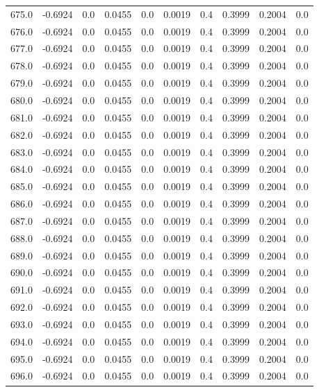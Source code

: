 \begin{longtable}{lrrrrrrrrr}
675.0 & -0.6924 & 0.0 & 0.0455 & 0.0 & 0.0019 & 0.4 & 0.3999 & 0.2004 & 0.0 \\
676.0 & -0.6924 & 0.0 & 0.0455 & 0.0 & 0.0019 & 0.4 & 0.3999 & 0.2004 & 0.0 \\
677.0 & -0.6924 & 0.0 & 0.0455 & 0.0 & 0.0019 & 0.4 & 0.3999 & 0.2004 & 0.0 \\
678.0 & -0.6924 & 0.0 & 0.0455 & 0.0 & 0.0019 & 0.4 & 0.3999 & 0.2004 & 0.0 \\
679.0 & -0.6924 & 0.0 & 0.0455 & 0.0 & 0.0019 & 0.4 & 0.3999 & 0.2004 & 0.0 \\
680.0 & -0.6924 & 0.0 & 0.0455 & 0.0 & 0.0019 & 0.4 & 0.3999 & 0.2004 & 0.0 \\
681.0 & -0.6924 & 0.0 & 0.0455 & 0.0 & 0.0019 & 0.4 & 0.3999 & 0.2004 & 0.0 \\
682.0 & -0.6924 & 0.0 & 0.0455 & 0.0 & 0.0019 & 0.4 & 0.3999 & 0.2004 & 0.0 \\
683.0 & -0.6924 & 0.0 & 0.0455 & 0.0 & 0.0019 & 0.4 & 0.3999 & 0.2004 & 0.0 \\
684.0 & -0.6924 & 0.0 & 0.0455 & 0.0 & 0.0019 & 0.4 & 0.3999 & 0.2004 & 0.0 \\
685.0 & -0.6924 & 0.0 & 0.0455 & 0.0 & 0.0019 & 0.4 & 0.3999 & 0.2004 & 0.0 \\
686.0 & -0.6924 & 0.0 & 0.0455 & 0.0 & 0.0019 & 0.4 & 0.3999 & 0.2004 & 0.0 \\
687.0 & -0.6924 & 0.0 & 0.0455 & 0.0 & 0.0019 & 0.4 & 0.3999 & 0.2004 & 0.0 \\
688.0 & -0.6924 & 0.0 & 0.0455 & 0.0 & 0.0019 & 0.4 & 0.3999 & 0.2004 & 0.0 \\
689.0 & -0.6924 & 0.0 & 0.0455 & 0.0 & 0.0019 & 0.4 & 0.3999 & 0.2004 & 0.0 \\
690.0 & -0.6924 & 0.0 & 0.0455 & 0.0 & 0.0019 & 0.4 & 0.3999 & 0.2004 & 0.0 \\
691.0 & -0.6924 & 0.0 & 0.0455 & 0.0 & 0.0019 & 0.4 & 0.3999 & 0.2004 & 0.0 \\
692.0 & -0.6924 & 0.0 & 0.0455 & 0.0 & 0.0019 & 0.4 & 0.3999 & 0.2004 & 0.0 \\
693.0 & -0.6924 & 0.0 & 0.0455 & 0.0 & 0.0019 & 0.4 & 0.3999 & 0.2004 & 0.0 \\
694.0 & -0.6924 & 0.0 & 0.0455 & 0.0 & 0.0019 & 0.4 & 0.3999 & 0.2004 & 0.0 \\
695.0 & -0.6924 & 0.0 & 0.0455 & 0.0 & 0.0019 & 0.4 & 0.3999 & 0.2004 & 0.0 \\
696.0 & -0.6924 & 0.0 & 0.0455 & 0.0 & 0.0019 & 0.4 & 0.3999 & 0.2004 & 0.0 \\

\end{longtable}
